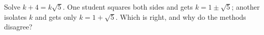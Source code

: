 Solve $k+4=k\sqrt5$. One student squares both sides and gets $k=1\pm\sqrt5$; another isolates $k$ and gets only $k=1+\sqrt5$. Which is right, and why do the methods disagree?
